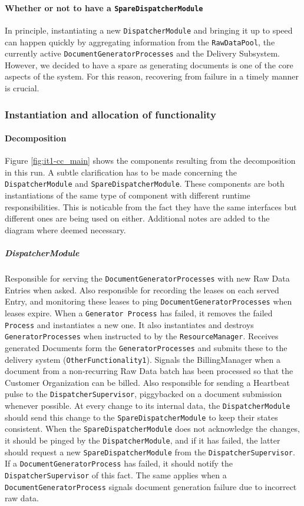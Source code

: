 \documentclass[a4paper,10pt]{article}
\begin{document}
\paragraph{Whether or not to have a \texttt{SpareDispatcherModule}}
In principle, instantiating a new \texttt{DispatcherModule} and bringing it up to speed can happen quickly by aggregating information from the \texttt{RawDataPool}, the currently active \texttt{DocumentGeneratorProcesses} and the Delivery Subsystem. However, we decided to have a spare as generating documents is one of the core aspects of the system. For this reason, recovering from failure in a timely manner is crucial.

\subsubsection{Instantiation and allocation of functionality}
\paragraph{Decomposition}
Figure \ref{fig:it1-cc_main} shows the components resulting from the decomposition in this run. A subtle clarification has to be made concerning the \texttt{DispatcherModule} and \texttt{SpareDispatcherModule}. These components are both instantiations of the same type of component with different runtime responsibilities. This is noticable from the fact they have the same interfaces but different ones are being used on either. Additional notes are added to the diagram where deemed necessary.

\subparagraph{DispatcherModule}
Responsible for serving the \texttt{DocumentGeneratorProcesses} with new Raw Data Entries when asked. Also responsible for recording the leases on each served Entry, and monitoring these leases to ping \texttt{DocumentGeneratorProcesses} when leases expire. When a \texttt{Generator Process} has failed, it removes the failed \texttt{Process} and instantiates a new one. It also instantiates and destroys \texttt{GeneratorProcesses} when instructed to by the \texttt{ResourceManager}. Receives generated Documents form the \texttt{GeneratorProcesses} and submits these to the delivery system (\texttt{OtherFunctionality1}). Signals the BillingManager when a document from a non-recurring Raw Data batch has been processed so that the Customer Organization can be billed. Also responsible for sending a Heartbeat pulse to the \texttt{DispatcherSupervisor}, piggybacked on a document submission whenever possible. At every change to its internal data, the \texttt{DispatcherModule} should send this change to the \texttt{SpareDispatcherModule} to keep their states consistent. When the \texttt{SpareDispatcherModule} does not acknowledge the changes, it should be pinged by the \texttt{DispatcherModule}, and if it has failed, the latter should request a new \texttt{SpareDispatcherModule} from the \texttt{DispatcherSupervisor}. If a \texttt{DocumentGeneratorProcess} has failed, it should notify the \texttt{DispatcherSupervisor} of this fact. The same applies when a \texttt{DocumentGeneratorProcess} signals document generation failure due to incorrect raw data.
\end{document}
